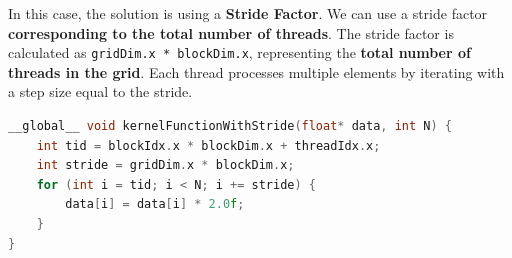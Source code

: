 \begin{itemize}
    In this case, the solution is using a \textbf{Stride Factor}. We can use a stride factor \textbf{corresponding to the total number of threads}. The stride factor is calculated as \texttt{gridDim.x * blockDim.x}, representing the \textbf{total number of threads in the grid}. Each thread processes multiple elements by iterating with a step size equal to the stride.
    \begin{lstlisting}[language=C++]
__global__ void kernelFunctionWithStride(float* data, int N) {
    int tid = blockIdx.x * blockDim.x + threadIdx.x;
    int stride = gridDim.x * blockDim.x;
    for (int i = tid; i < N; i += stride) {
        data[i] = data[i] * 2.0f;
    }
}
    \end{lstlisting}
\end{itemize}